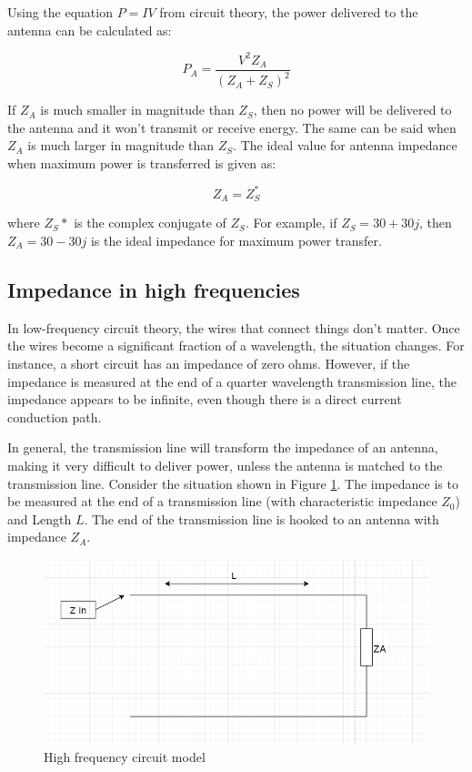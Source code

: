 \documentclass[a4paper,12pt]{report}
\begin{document}
Using the equation $P=IV$ from circuit theory,
the power delivered to the antenna can be calculated as:

\begin{equation}
  P_A = \frac{V^2 Z_A}{(Z_A + Z_S) ^2}
\end{equation}

If $Z_A$ is much smaller in magnitude than $Z_S$,
then no power will be delivered to the antenna and
it won't transmit or receive energy.
The same can be said when $Z_A$ is much larger in magnitude than $Z_S$.
The ideal value for antenna impedance when maximum power is transferred is given as:

\begin{equation}
  Z_A = Z_S^*
\end{equation}

where $Z_S*$ is the complex conjugate of $Z_S$.
For example, if $Z_S = 30 + 30j$, then $Z_A = 30 - 30j$ is the ideal
impedance for maximum power transfer.

\subsection{Impedance in high frequencies}

In low-frequency circuit theory, the wires that connect things don't matter.
Once the wires become a significant fraction of a wavelength,
the situation changes. For instance,
a short circuit has an impedance of zero ohms. However,
if the impedance is measured at the end of a quarter wavelength transmission line,
the impedance appears to be infinite,
even though there is a direct current conduction path.

In general, the transmission line will transform the impedance of an antenna,
making it very difficult to deliver power,
unless the antenna is matched to the transmission line.
Consider the situation shown in Figure \ref{fig:high_freq_circuit_diagram}.
The impedance is to be measured at the end of a transmission line
(with characteristic impedance $Z_0$) and Length $L$.
The end of the transmission line is hooked to an antenna with impedance $Z_A$.

\begin{figure}
  \begin{center}
    \includegraphics[clip, keepaspectratio, width=0.5\linewidth]{img/high_freq_circuit_diagram.png}
    \caption{High frequency circuit model}
    \label{fig:high_freq_circuit_diagram}
  \end{center}
\end{figure}
\end{document}
